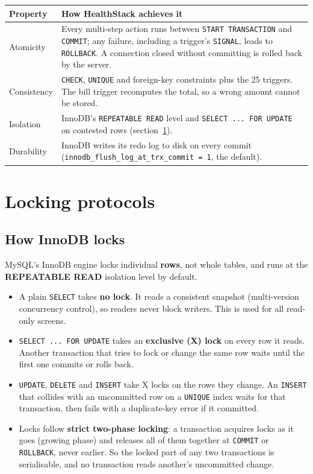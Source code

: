 \documentclass[11pt,a4paper]{article}
\newcommand{\code}[1]{\texttt{#1}}
\begin{document}
\begin{center}
\small
\begin{tabularx}{\textwidth}{l L}
\toprule
\textbf{Property} & \textbf{How HealthStack achieves it} \\
\midrule
Atomicity   & Every multi-step action runs between \code{START TRANSACTION} and \code{COMMIT}; any failure, including a trigger's \code{SIGNAL}, leads to \code{ROLLBACK}. A connection closed without committing is rolled back by the server. \\
Consistency & \code{CHECK}, \code{UNIQUE} and foreign-key constraints plus the 25 triggers. The bill trigger recomputes the total, so a wrong amount cannot be stored. \\
Isolation   & InnoDB's \code{REPEATABLE READ} level and \code{SELECT ... FOR UPDATE} on contested rows (section~\ref{sec:locking}). \\
Durability  & InnoDB writes its redo log to disk on every commit (\code{innodb\_flush\_log\_at\_trx\_commit = 1}, the default). \\
\bottomrule
\end{tabularx}
\end{center}

\section{Locking protocols}
\label{sec:locking}

\subsection{How InnoDB locks}

MySQL's InnoDB engine locks individual \textbf{rows}, not whole tables, and runs at the \textbf{REPEATABLE READ} isolation level by default.

\begin{itemize}
  \item A plain \code{SELECT} takes \textbf{no lock}. It reads a consistent snapshot (multi-version concurrency control), so readers never block writers. This is used for all read-only screens.
  \item \code{SELECT ... FOR UPDATE} takes an \textbf{exclusive (X) lock} on every row it reads. Another transaction that tries to lock or change the same row waits until the first one commits or rolls back.
  \item \code{UPDATE}, \code{DELETE} and \code{INSERT} take X locks on the rows they change. An \code{INSERT} that collides with an uncommitted row on a \code{UNIQUE} index waits for that transaction, then fails with a duplicate-key error if it committed.
  \item Locks follow \textbf{strict two-phase locking}: a transaction acquires locks as it goes (growing phase) and releases all of them together at \code{COMMIT} or \code{ROLLBACK}, never earlier. So the locked part of any two transactions is serialisable, and no transaction reads another's uncommitted change.
\end{itemize}
\end{document}
